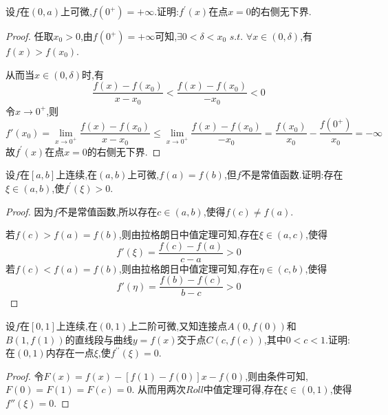 \documentclass[lang=cn,newtx,10pt,scheme=chinese]{../Template/elegantbook}
\begin{document}
\begin{exercise}
    设\(f\)在\((0,a)\)上可微,\(f(0^{+}) = +\infty\).证明:\(f^{\prime}(x)\)在点\(x = 0\)的右侧无下界.
    \begin{proof}
    任取$x_0>0$,由\(f(0^{+}) = +\infty\)可知,$\exists 0<\delta<x_0\,\,s.t.\,\,\forall x\in(0,\delta)$,有$f(x)>f(x_0)$.
    
    从而当$x\in(0,\delta)$时,有
    \begin{equation}
        \frac{f(x)-f(x_0)}{x-x_0}<\frac{f(x)-f(x_0)}{-x_0}<0
        \nonumber
    \end{equation}
    令$x\to0^{+}$,则
    \begin{equation}
        f'(x_0)=\underset{x\rightarrow 0^+}{\lim}\frac{f(x)-f(x_0)}{x-x_0}\leqslant \underset{x\rightarrow 0^+}{\lim}\frac{f(x)-f(x_0)}{-x_0}=\frac{f\left( x_0 \right)}{x_0}-\frac{f\left( 0^+ \right)}{x_0}=-\infty 
        \nonumber
    \end{equation}
    故\(f^{\prime}(x)\)在点\(x = 0\)的右侧无下界.
    \end{proof}
\end{exercise}

\begin{exercise}
    设\(f\)在\([a,b]\)上连续,在\((a,b)\)上可微,\(f(a)=f(b)\),但\(f\)不是常值函数.证明:存在\(\xi\in(a,b)\),使\(f^{\prime}(\xi)>0\).
    \begin{proof}
    因为\(f\)不是常值函数,所以存在$c\in(a,b)$,使得$f(c)\ne f(a)$.
    
    若$f(c)>f(a)=f(b)$,则由拉格朗日中值定理可知,存在$\xi\in(a,c)$,使得
    \begin{equation}
        f'\left( \xi \right) =\frac{f\left( c \right) -f\left( a \right)}{c-a}>0
        \nonumber
    \end{equation}
    若$f(c)<f(a)=f(b)$,则由拉格朗日中值定理可知,存在$\eta\in(c,b)$,使得
    \begin{equation}
        f'\left( \eta \right) =\frac{f\left( b \right) -f\left( c \right)}{b-c}>0
        \nonumber
    \end{equation}
    \end{proof}
\end{exercise}

\begin{exercise}
    设\(f\)在\([0,1]\)上连续,在\((0,1)\)上二阶可微,又知连接点\(A(0,f(0))\)和\(B(1,f(1))\)的直线段与曲线\(y = f(x)\)交于点\(C(c,f(c))\),其中\(0<c<1\).证明:在\((0,1)\)内存在一点\(\xi\),使\(f^{\prime\prime}(\xi)=0\).
    \begin{proof}
    令$F(x)=f(x)-[f(1)-f(0)]x-f(0)$,则由条件可知,$F(0)=F(1)=F(c)=0$.
    从而用两次$Roll$中值定理可得,存在$\xi\in(0,1)$,使得$f''(\xi)=0$.
    \end{proof}
\end{exercise}
\end{document}
